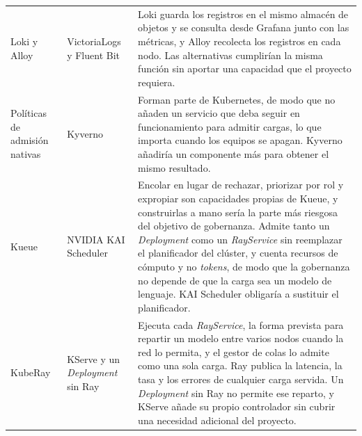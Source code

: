 {\begin{xltabular}{\textwidth}{>{\raggedright\arraybackslash}p{0.17\textwidth} >{\raggedright\arraybackslash}p{0.2\textwidth} >{\raggedright\arraybackslash}X}
    \addlinespace[4pt]
    Loki y Alloy & VictoriaLogs y Fluent Bit & Loki guarda los registros en el mismo almacén de objetos y se consulta desde Grafana junto con las métricas, y Alloy recolecta los registros en cada nodo. Las alternativas cumplirían la misma función sin aportar una capacidad que el proyecto requiera. \\
    \addlinespace[4pt]
    Políticas de admisión nativas & Kyverno & Forman parte de Kubernetes, de modo que no añaden un servicio que deba seguir en funcionamiento para admitir cargas, lo que importa cuando los equipos se apagan. Kyverno añadiría un componente más para obtener el mismo resultado. \\
    \addlinespace[4pt]
    Kueue & NVIDIA KAI Scheduler & Encolar en lugar de rechazar, priorizar por rol y expropiar son capacidades propias de Kueue, y construirlas a mano sería la parte más riesgosa del objetivo de gobernanza. Admite tanto un \emph{Deployment} como un \emph{RayService} sin reemplazar el planificador del clúster, y cuenta recursos de cómputo y no \emph{tokens}, de modo que la gobernanza no depende de que la carga sea un modelo de lenguaje. KAI Scheduler obligaría a sustituir el planificador. \\
    \addlinespace[4pt]
    KubeRay & KServe y un \emph{Deployment} sin Ray & Ejecuta cada \emph{RayService}, la forma prevista para repartir un modelo entre varios nodos cuando la red lo permita, y el gestor de colas lo admite como una sola carga. Ray publica la latencia, la tasa y los errores de cualquier carga servida. Un \emph{Deployment} sin Ray no permite ese reparto, y KServe añade su propio controlador sin cubrir una necesidad adicional del proyecto. \\
\end{xltabular}
}
